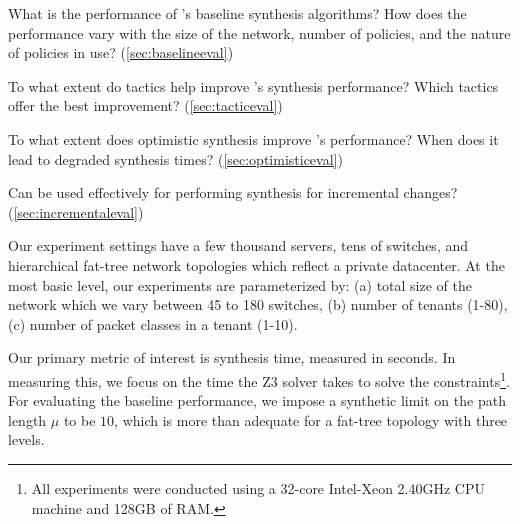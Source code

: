 \begin{compactitemize}

\item What is the performance of \Name's baseline synthesis
  algorithms? How does the performance vary with the size of the
  network, number of policies, and the nature of policies in use? (\cref{sec:baselineeval})

\item To what extent do tactics help improve \Name's synthesis
  performance? Which tactics offer the best improvement? (\cref{sec:tacticeval})

\item To what extent does optimistic synthesis improve \Name's
  performance? When does it lead to degraded synthesis times? (\cref{sec:optimisticeval})

\item Can \Name be used effectively for performing synthesis for
incremental changes?  (\cref{sec:incrementaleval})

\end{compactitemize}
Our experiment settings have a few thousand servers, tens of
switches, and hierarchical fat-tree network topologies which reflect
a private datacenter. At the
most basic level, our experiments are parameterized by: (a) total size
of the network which we vary between 45 to 180 switches, (b) number of
tenants (1-80), (c) number of packet classes in a tenant (1-10). 

Our primary metric of interest is synthesis time, measured in
seconds. In measuring this, we focus on the time the Z3 solver takes
to solve the constraints\footnote{All experiments were conducted using a
	32-core Intel-Xeon 2.40GHz CPU machine and
	128GB of RAM.}. For evaluating the baseline performance, we impose a
synthetic limit on the path length $\mu$ to be $10$, which is more than adequate 
for a fat-tree topology with three levels. 

